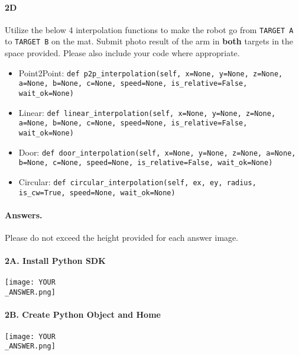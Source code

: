 \paragraph{2D} Utilize the below 4 interpolation functions to make the robot go from \texttt{TARGET A} to \texttt{TARGET B} on the mat.
Submit photo result of the arm in \textbf{both} targets in the space provided.
Please also include your code where appropriate.
\begin{itemize}
    \item Point2Point: \texttt{def p2p\_interpolation(self, x=None, y=None, z=None, a=None, b=None, c=None, speed=None, is\_relative=False, wait\_ok=None)}
    \item Linear: \texttt{def linear\_interpolation(self, x=None, y=None, z=None, a=None, b=None, c=None, speed=None, is\_relative=False, wait\_ok=None)}
    \item Door: \texttt{def door\_interpolation(self, x=None, y=None, z=None, a=None, b=None, c=None, speed=None, is\_relative=False, wait\_ok=None)}
    \item Circular: \texttt{def circular\_interpolation(self, ex, ey, radius, is\_cw=True, speed=None, wait\_ok=None)}
\end{itemize}

\paragraph{Answers.}
Please do not exceed the height provided for each answer image.


\paragraph{2A. Install Python SDK}
\begin{center}
    \texttt{[image: YOUR\\\_ANSWER.png]}
\end{center}

\paragraph{2B. Create Python Object and Home}
\begin{center}
    \texttt{[image: YOUR\\\_ANSWER.png]}
\end{center}

